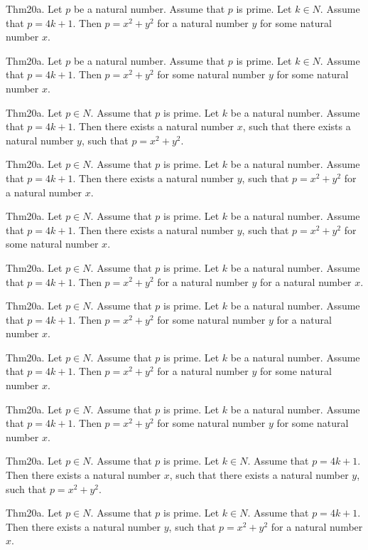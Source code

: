 \documentclass{article}
\begin{document}
Thm20a. Let $p$ be a natural number. Assume that $p$ is prime. Let $k \in N$. Assume that $p = 4 k + 1$. Then $p = x ^{ 2}+ y ^{ 2}$ for a natural number $y$ for some natural number $x$.

Thm20a. Let $p$ be a natural number. Assume that $p$ is prime. Let $k \in N$. Assume that $p = 4 k + 1$. Then $p = x ^{ 2}+ y ^{ 2}$ for some natural number $y$ for some natural number $x$.

Thm20a. Let $p \in N$. Assume that $p$ is prime. Let $k$ be a natural number. Assume that $p = 4 k + 1$. Then there exists a natural number $x$, such that there exists a natural number $y$, such that $p = x ^{ 2}+ y ^{ 2}$.

Thm20a. Let $p \in N$. Assume that $p$ is prime. Let $k$ be a natural number. Assume that $p = 4 k + 1$. Then there exists a natural number $y$, such that $p = x ^{ 2}+ y ^{ 2}$ for a natural number $x$.

Thm20a. Let $p \in N$. Assume that $p$ is prime. Let $k$ be a natural number. Assume that $p = 4 k + 1$. Then there exists a natural number $y$, such that $p = x ^{ 2}+ y ^{ 2}$ for some natural number $x$.

Thm20a. Let $p \in N$. Assume that $p$ is prime. Let $k$ be a natural number. Assume that $p = 4 k + 1$. Then $p = x ^{ 2}+ y ^{ 2}$ for a natural number $y$ for a natural number $x$.

Thm20a. Let $p \in N$. Assume that $p$ is prime. Let $k$ be a natural number. Assume that $p = 4 k + 1$. Then $p = x ^{ 2}+ y ^{ 2}$ for some natural number $y$ for a natural number $x$.

Thm20a. Let $p \in N$. Assume that $p$ is prime. Let $k$ be a natural number. Assume that $p = 4 k + 1$. Then $p = x ^{ 2}+ y ^{ 2}$ for a natural number $y$ for some natural number $x$.

Thm20a. Let $p \in N$. Assume that $p$ is prime. Let $k$ be a natural number. Assume that $p = 4 k + 1$. Then $p = x ^{ 2}+ y ^{ 2}$ for some natural number $y$ for some natural number $x$.

Thm20a. Let $p \in N$. Assume that $p$ is prime. Let $k \in N$. Assume that $p = 4 k + 1$. Then there exists a natural number $x$, such that there exists a natural number $y$, such that $p = x ^{ 2}+ y ^{ 2}$.

Thm20a. Let $p \in N$. Assume that $p$ is prime. Let $k \in N$. Assume that $p = 4 k + 1$. Then there exists a natural number $y$, such that $p = x ^{ 2}+ y ^{ 2}$ for a natural number $x$.
\end{document}
